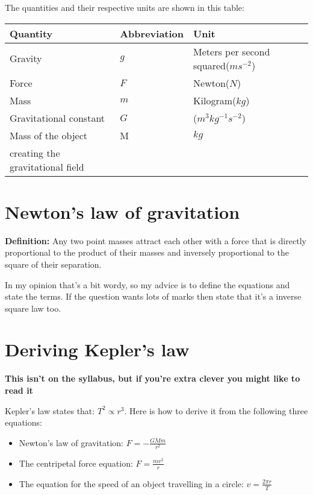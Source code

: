 \documentclass{article}
\begin{document}
The quantities and their respective units are shown in this table:

\begin{center}
	\begin{tabular}{|l|l|l|}
		\hline
			Quantity & Abbreviation & Unit \\ \hline
			Gravity & $g$ & Meters per second squared($ms^{-2}$) \\ \hline
			Force & $F$ & Newton($N$) \\ \hline
			Mass & $m$ & Kilogram($kg$) \\ \hline
			Gravitational constant & $G$ & ($m^3kg^{-1}s^{-2}$) \\ \hline
			Mass of the object & M & $kg$ \\
			creating the gravitational field & & \\ \hline
	\end{tabular}
\end{center}



\section*{Newton's law of gravitation}
\textbf{Definition:} Any two point masses attract each other with a force that is directly proportional to the product of their masses and inversely proportional to the square of their separation.

In my opinion that's a bit wordy, so my advice is to define the equations and state the terms. If the question wants lots of marks then state that it's a inverse square law too.


\section*{Deriving Kepler's law}
\textbf{This isn't on the syllabus, but if you're extra clever you might like to read it}

Kepler's law states that: $T^2 \propto r^3$. Here is how to derive it from the following three equations:

\begin{itemize}

\item Newton's law of gravitation: $F = -\frac{GMm}{r^2}$

\item The centripetal force equation: $F = \frac{mv^2}{r}$

\item The equation for the speed of an object travelling in a circle: $v = \frac{2 \pi r}{T}$

\end{itemize}
\end{document}
